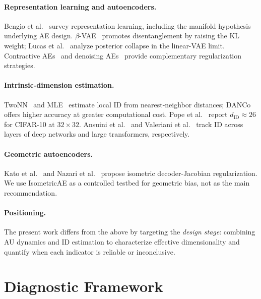 \documentclass[make,article,submit,pdftex,moreauthors]{Definitions/mdpi}
\begin{document}
\paragraph{Representation learning and autoencoders.}
Bengio et al.~\cite{bengio2013representation} survey representation learning,
including the manifold hypothesis~\cite{fefferman2016manifold} underlying AE
design.
$\beta$-VAE~\cite{higgins2017betavae} promotes disentanglement by raising the
KL weight; Lucas et al.~\cite{lucas2019elbo} analyze posterior collapse in
the linear-VAE limit.
Contractive AEs~\cite{rifai2011cae} and denoising AEs~\cite{alain2014dae}
provide complementary regularization strategies.

\paragraph{Intrinsic-dimension estimation.}
TwoNN~\cite{facco2017twonn} and MLE~\cite{levina2005mle} estimate local ID
from nearest-neighbor distances;
DANCo~\cite{ceruti2014danco} offers higher accuracy at greater computational
cost.
Pope et al.~\cite{pope2021intrinsic} report $d_{\mathrm{ID}} \approx 26$
for CIFAR-10 at $32 \times 32$.
Ansuini et al.~\cite{ansuini2019intrinsic} and Valeriani et
al.~\cite{valeriani2023geometry} track ID across layers of deep networks
and large transformers, respectively.

\paragraph{Geometric autoencoders.}
Kato et al.~\cite{kato2020rdae} and Nazari et al.~\cite{nazari2023geometric}
propose isometric decoder-Jacobian regularization.
We use IsometricAE as a controlled testbed for geometric bias, not as the
main recommendation.

\paragraph{Positioning.}
The present work differs from the above by targeting the \emph{design stage}:
combining AU dynamics and ID estimation to characterize effective
dimensionality and quantify when each indicator is reliable or inconclusive.

\section{Diagnostic Framework}\label{sec:framework}
\end{document}
